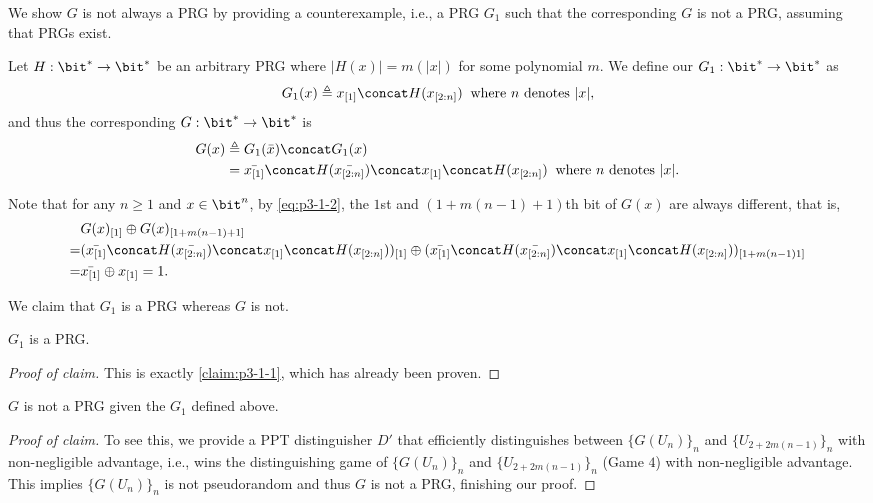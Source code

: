 

\begin{answer}[ii]
We show $G$ is not always a PRG by providing a counterexample, i.e., a PRG $G_1$ such that the corresponding $G$ is not a PRG, assuming that PRGs exist.

Let $H:\bit^\ast \to \bit^{\ast}$ be an arbitrary PRG where $|H(x)|=m(|x|)$ for some polynomial $m$. We define our ${G_1}:\bit^\ast\to \bit^{\ast}$ as
\[
    G_1 (x)\triangleq x_{[1]} \concat H(x_{[2:n]}) 
    \;\; \text{where } n \text{ denotes } |x|,
\]
and thus the corresponding $G:\bit^\ast\to \bit^{\ast}$ is
\begin{align}
    G(x)&\triangleq G_1(\bar{x})\concat G_1(x) \notag\\
    &= \bar{x_{[1]}} \concat H(\bar{x_{[2:n]}}) \concat x_{[1]} \concat H(x_{[2:n]}) 
    \;\; \text{where } n \text{ denotes } |x|. \label{eq:p3-1-2}
\end{align}

\begin{observation}\label{obs:p3-2-1}
    Note that for any $n\ge 1$ and $x\in \bit^n$, by \eqref{eq:p3-1-2}, the $1$st and $(1+m(n-1)+1)$th bit of $G(x)$ are always different, that is,
    \begin{align*}
        &G(x)_{[1]} \oplus G(x)_{[1+m(n-1)+1]}\\
        =& (\bar{x_{[1]}} \concat H(\bar{x_{[2:n]}}) \concat x_{[1]} \concat H(x_{[2:n]}))_{[1]}
        \oplus (\bar{x_{[1]}} \concat H(\bar{x_{[2:n]}}) \concat x_{[1]} \concat H(x_{[2:n]}))_{[1+m(n-1)1]}\\
        =& \bar{x_{[1]}} \oplus x_{[1]} = 1.
    \end{align*}
\end{observation}

We claim that $G_1$ is a PRG whereas $G$ is not.

\begin{claim}\label{claim:p3-2-1}
    $G_1$ is a PRG.
\end{claim}
\begin{proof}[Proof of claim] 
    This is exactly \autoref{claim:p3-1-1}, which has already been proven.
\end{proof}



\begin{claim}\label{claim:p3-2-2}
    $G$ is not a PRG given the $G_1$ defined above.
\end{claim}
\begin{proof}[Proof of claim]
    To see this, we provide a PPT distinguisher $D'$ that efficiently distinguishes between $\{G(U_n)\}_n$ and $\{U_{2+2m(n-1)}\}_n$ with non-negligible advantage, i.e., wins the distinguishing game of $\{G(U_n)\}_n$ and $\{U_{2+2m(n-1)}\}_n$ (Game $4$) with non-negligible advantage. This implies $\{G(U_n)\}_n$ is not pseudorandom and thus $G$ is not a PRG, finishing our proof.
    

\end{proof}
\end{answer}
